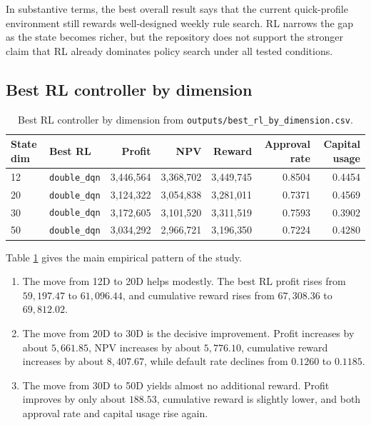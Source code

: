 \documentclass[12pt,a4paper]{article}
\begin{document}
In substantive terms, the best overall result says that the current quick-profile environment still rewards well-designed weekly rule search. RL narrows the gap as the state becomes richer, but the repository does not support the stronger claim that RL already dominates policy search under all tested conditions.

\subsection{Best RL controller by dimension}

\begin{table}[H]
    \centering
    \small
    \begin{tabular}{l l r r r r r}
        \toprule
        State dim & Best RL              & Profit        & NPV           & Reward        & Approval rate & Capital usage \\
        \midrule
        12        & \texttt{double\_dqn} & 3{,}446{,}564 & 3{,}368{,}702 & 3{,}449{,}745 & 0.8504        & 0.4454        \\
        20        & \texttt{double\_dqn} & 3{,}124{,}322 & 3{,}054{,}838 & 3{,}281{,}011 & 0.7371        & 0.4569        \\
        30        & \texttt{double\_dqn} & 3{,}172{,}605 & 3{,}101{,}520 & 3{,}311{,}519 & 0.7593        & 0.3902        \\
        50        & \texttt{double\_dqn} & 3{,}034{,}292 & 2{,}966{,}721 & 3{,}196{,}350 & 0.7224        & 0.4280        \\
        \bottomrule
    \end{tabular}
    \caption{Best RL controller by dimension from \texttt{outputs/best\_rl\_by\_dimension.csv}.}
    \label{tab:en-best-rl}
\end{table}

Table \ref{tab:en-best-rl} gives the main empirical pattern of the study.
\begin{enumerate}[leftmargin=*]
    \item The move from 12D to 20D helps modestly. The best RL profit rises from $59{,}197.47$ to $61{,}096.44$, and cumulative reward rises from $67{,}308.36$ to $69{,}812.02$.
    \item The move from 20D to 30D is the decisive improvement. Profit increases by about $5{,}661.85$, NPV increases by about $5{,}776.10$, cumulative reward increases by about $8{,}407.67$, while default rate declines from $0.1260$ to $0.1185$.
    \item The move from 30D to 50D yields almost no additional reward. Profit improves by only about $188.53$, cumulative reward is slightly lower, and both approval rate and capital usage rise again.
\end{enumerate}
\end{document}
